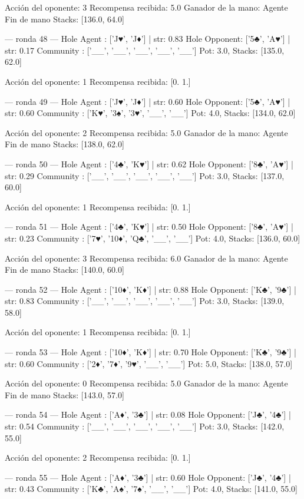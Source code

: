 Acción del oponente: 3
Recompensa recibida: 5.0
Ganador de la mano: Agente
Fin de mano Stacks: [136.0, 64.0]


--- ronda 48 ---
Hole Agent : ['J♥', 'J♦'] | str: 0.83
Hole Opponent: ['5♣', 'A♥'] | str: 0.17
Community  : ['__', '__', '__', '__', '__']
Pot: 3.0, Stacks: [135.0, 62.0]

Acción del oponente: 1
Recompensa recibida: [0. 1.]

--- ronda 49 ---
Hole Agent : ['J♥', 'J♦'] | str: 0.60
Hole Opponent: ['5♣', 'A♥'] | str: 0.60
Community  : ['K♥', '3♠', '3♥', '__', '__']
Pot: 4.0, Stacks: [134.0, 62.0]

Acción del oponente: 2
Recompensa recibida: 5.0
Ganador de la mano: Agente
Fin de mano Stacks: [138.0, 62.0]


--- ronda 50 ---
Hole Agent : ['4♣', 'K♥'] | str: 0.62
Hole Opponent: ['8♣', 'A♥'] | str: 0.29
Community  : ['__', '__', '__', '__', '__']
Pot: 3.0, Stacks: [137.0, 60.0]

Acción del oponente: 1
Recompensa recibida: [0. 1.]

--- ronda 51 ---
Hole Agent : ['4♣', 'K♥'] | str: 0.50
Hole Opponent: ['8♣', 'A♥'] | str: 0.23
Community  : ['7♥', '10♦', 'Q♣', '__', '__']
Pot: 4.0, Stacks: [136.0, 60.0]

Acción del oponente: 3
Recompensa recibida: 6.0
Ganador de la mano: Agente
Fin de mano Stacks: [140.0, 60.0]


--- ronda 52 ---
Hole Agent : ['10♦', 'K♦'] | str: 0.88
Hole Opponent: ['K♣', '9♣'] | str: 0.83
Community  : ['__', '__', '__', '__', '__']
Pot: 3.0, Stacks: [139.0, 58.0]

Acción del oponente: 1
Recompensa recibida: [0. 1.]

--- ronda 53 ---
Hole Agent : ['10♦', 'K♦'] | str: 0.70
Hole Opponent: ['K♣', '9♣'] | str: 0.60
Community  : ['2♦', '7♦', '9♥', '__', '__']
Pot: 5.0, Stacks: [138.0, 57.0]

Acción del oponente: 0
Recompensa recibida: 5.0
Ganador de la mano: Agente
Fin de mano Stacks: [143.0, 57.0]


--- ronda 54 ---
Hole Agent : ['A♦', '3♣'] | str: 0.08
Hole Opponent: ['J♣', '4♣'] | str: 0.54
Community  : ['__', '__', '__', '__', '__']
Pot: 3.0, Stacks: [142.0, 55.0]

Acción del oponente: 2
Recompensa recibida: [0. 1.]

--- ronda 55 ---
Hole Agent : ['A♦', '3♣'] | str: 0.60
Hole Opponent: ['J♣', '4♣'] | str: 0.43
Community  : ['K♣', 'A♠', '7♠', '__', '__']
Pot: 4.0, Stacks: [141.0, 55.0]


